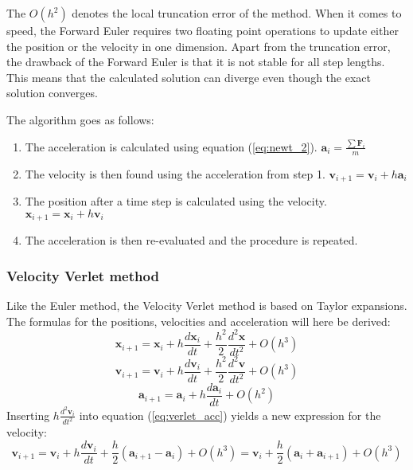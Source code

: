 \documentclass[10pt,a4paper,titlepage]{article}
\begin{document}
The $O(h^2)$ denotes the local truncation error of the method. When it comes to speed, the Forward Euler requires two floating point operations to update either the position or the velocity in one dimension. Apart from the truncation error, the drawback of the Forward Euler is that it is not stable for all step lengths. This means that the calculated solution can diverge even though the exact solution converges. 

The algorithm goes as follows:
\begin{enumerate}%
\item The acceleration is calculated using equation (\ref{eq:newt_2}). \newline $\mathbf{a}_i=\frac{\sum\mathbf{F}_i}{m}$
\item The velocity is then found using the acceleration from step 1. \newline
$\mathbf{v}_{i+1}=\mathbf{v}_i+ h\mathbf{a}_i$
\item The position after a time step is calculated using the velocity.
\newline $\mathbf{x}_{i+1}=\mathbf{x}_i+h\mathbf{v}_i$

\item The acceleration is then re-evaluated and the procedure is repeated. 
\end{enumerate}

\subsubsection{Velocity Verlet method}
Like the Euler method, the Velocity Verlet method is based on Taylor expansions. The formulas for the positions, velocities and acceleration will here be derived:
\begin{equation}
\mathbf{x}_{i+1} = \mathbf{x}_i + h\frac{d\mathbf{x}_i}{dt}+\frac{h^2}{2}\frac{d^2\mathbf{x}}{dt^2}+O(h^3)
\end{equation}
\begin{equation}
\mathbf{v}_{i+1} = \mathbf{v}_i + h\frac{d\mathbf{v}_i}{dt}+\frac{h^2}{2}\frac{d^2\mathbf{v}}{dt^2}+O(h^3)
\end{equation}
\begin{equation}
\label{eq:verlet_acc}
\mathbf{a}_{i+1}=\mathbf{a}_i+h\frac{d\mathbf{a}_i}{dt}+O(h^2)
\end{equation}
Inserting $h\frac{d^2\mathbf{v}_i}{dt^2}$ into equation (\ref{eq:verlet_acc}) yields a new expression for the velocity:
\begin{equation}
\mathbf{v}_{i+1} = \mathbf{v}_i + h\frac{d\mathbf{v}_i}{dt}+\frac{h}{2}\left(\mathbf{a}_{i+1}-\mathbf{a}_i\right)+O(h^3) = \mathbf{v}_i + \frac{h}{2}(\mathbf{a}_i + \mathbf{a}_{i+1}) +O(h^3)
\end{equation}
\end{document}
